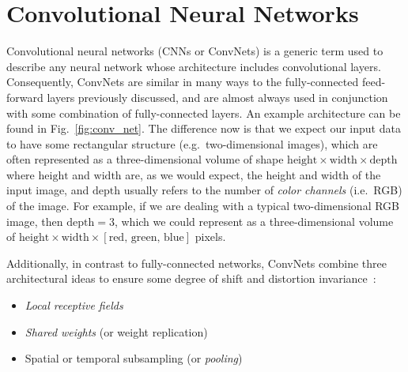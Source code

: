 \documentclass[../main.tex]{subfiles}
\begin{document}
\section{Convolutional Neural Networks}
Convolutional neural networks (CNNs or ConvNets) is a generic term used to describe any neural network whose
architecture includes convolutional layers. 
%
Consequently, ConvNets are similar in many ways to the fully-connected feed-forward layers previously discussed, and
are almost always used in conjunction with some combination of fully-connected layers.
%
An example architecture can be found in Fig.~\ref{fig:conv_net}.
%
The difference now is that we expect our input data to have some rectangular structure (e.g.\ two-dimensional images),
which are often represented as a three-dimensional volume of shape
$\mathrm{height}\times\mathrm{width}\times\mathrm{depth}$ where $\mathrm{height}$ and $\mathrm{width}$ are, as
we would expect, the height and width of the input image, and $\mathrm{depth}$ usually refers to the number of
\emph{color channels} (i.e.\ RGB) of the image.
%
For example, if we are dealing with a typical two-dimensional RGB image, then $\mathrm{depth} = 3$, which we could
represent as a three-dimensional volume of $\mathrm{height}\times\mathrm{width}\times[\mathrm{red},
\,\mathrm{green},\, \mathrm{blue}]$ pixels.

Additionally, in contrast to fully-connected networks, ConvNets combine three architectural ideas to ensure some degree
of shift and distortion invariance~\cite{lecun1995convolutional}:
%
\begin{itemize}
  \item \emph{Local receptive fields}
  \item \emph{Shared weights} (or weight replication)
  \item Spatial or temporal subsampling (or \emph{pooling})
\end{itemize}
%
\end{document}
